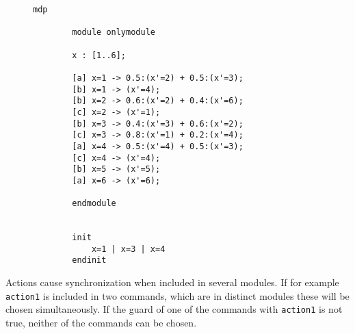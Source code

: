 \documentclass[preview]{standalone}
\begin{document}
\begin{figure}
	\begin{lstlisting}[language=prism, caption={\prism model file for the \mdpN \mdp given by Figure \ref{fig:exampleMdp} \redcomment{initials not by probability!}. This example has only one variable representing the six states in \mdp and the actions \texttt{a}, \texttt{b} and \texttt{c} referring to \action, \actionb, and \actionc in \mdp, which are only used for labeling here.},label={lst:exmpprism}]
		mdp
		
		module onlymodule
		
		x : [1..6];
		
		[a] x=1 -> 0.5:(x'=2) + 0.5:(x'=3);
		[b] x=1 -> (x'=4);
		[b] x=2 -> 0.6:(x'=2) + 0.4:(x'=6);
		[c] x=2 -> (x'=1);
		[b] x=3 -> 0.4:(x'=3) + 0.6:(x'=2);
		[c] x=3 -> 0.8:(x'=1) + 0.2:(x'=4);
		[a] x=4 -> 0.5:(x'=4) + 0.5:(x'=3);
		[c] x=4 -> (x'=4);
		[b] x=5 -> (x'=5);
		[a] x=6 -> (x'=6);
		
		endmodule
		
		
		init
			x=1 | x=3 | x=4
		endinit		
	\end{lstlisting}
\end{figure}

Actions cause synchronization when included in several modules. If for example \texttt{action1} is included in two commands, which are in distinct modules these will be chosen simultaneously. If the guard of one of the commands with \texttt{action1} is not true, neither of the commands can be chosen\cite{Kwiatkowska2000, Kwiatkowska2011}.


\end{document}
